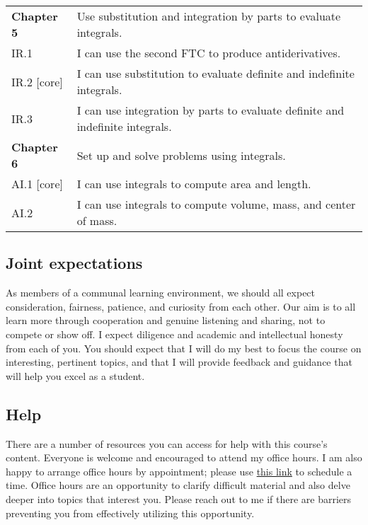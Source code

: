 \documentclass[11pt,twoside]{amsart}
\begin{document}
\begin{center}
\begin{longtable}{@{}ll@{}}
\textbf{Chapter 5} & Use substitution and integration by parts to evaluate integrals.\\ 
IR.1 & I can use the second FTC to produce antiderivatives.\\
IR.2 [core] & I can use substitution to evaluate definite and indefinite integrals.\\
IR.3 & I can use integration by parts to evaluate definite and indefinite integrals.\\
\midrule

\textbf{Chapter 6} & Set up and solve problems using integrals.\\
AI.1 [core] & I can use integrals to compute area and length.\\
AI.2 & I can use integrals to compute volume, mass, and center of mass.\\ %

\bottomrule
\end{longtable}
\end{center}



\subsection*{Joint expectations}
As members of a communal learning environment, we should all expect consideration, fairness, patience, and curiosity from each other.  Our aim is to all learn more through cooperation and genuine listening and sharing, not to compete or show off.  I expect diligence and academic and intellectual honesty from each of you.  You should expect that I will do my best to focus the course on interesting, pertinent topics, and that I will provide feedback and guidance that will help you excel as a student.

\subsection*{Help}
There are a number of resources you can access for help with this course's content.  Everyone is welcome and encouraged to attend my office hours.  I am also happy to arrange office hours by appointment; please use \href{https://calendar.notion.so/meet/kyleormsby/office}{this link} to schedule a time.  Office hours are an opportunity to clarify difficult material and also delve deeper into topics that interest you.  Please reach out to me if there are barriers preventing you from effectively utilizing this opportunity.
\end{document}
